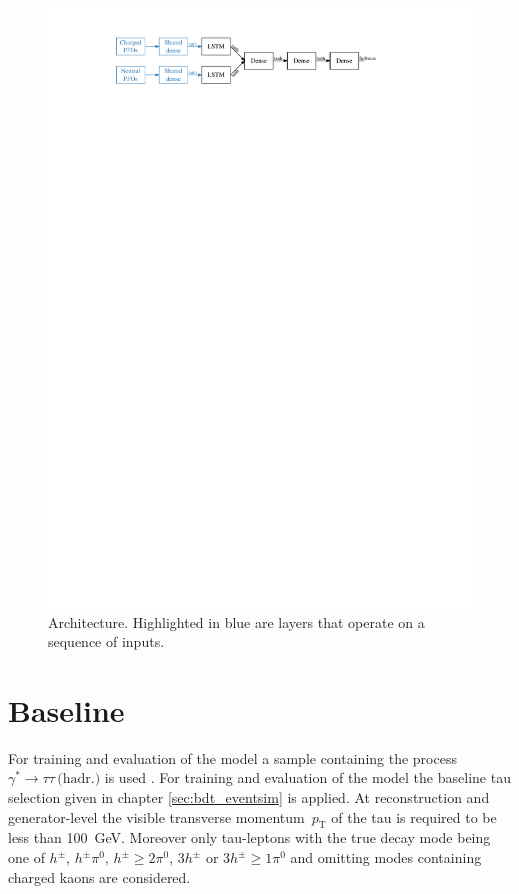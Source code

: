 \begin{figure}[ht]
  \centering
  \includegraphics{./figures/decay_mode_classification/baseline_architecture.pdf}
  \caption{Architecture. Highlighted in blue are layers that operate on a sequence of inputs.}
  \label{fig:pfo_rnn_baseline_arch}
\end{figure}


\section{Baseline}
\label{sec:pfo_baseline}

For training and evaluation of the model a sample containing the process
$\gamma^* \rightarrow \tau \tau \, \text{(hadr.)}$ is used . For training and evaluation of the model the baseline tau
selection given in chapter \ref{sec:bdt_eventsim} is applied. At reconstruction
and generator-level the visible transverse momentum~$p_\text{T}$ of the tau is
required to be less than \SI{100}{\giga\electronvolt}. Moreover only tau-leptons
with the true decay mode being one of $h^\pm$, $h^\pm \pi^0$,
$h^\pm \geq 2\pi^0$, $3h^\pm$ or $3h^\pm \geq 1\pi^0$ and omitting modes
containing charged kaons are considered.


